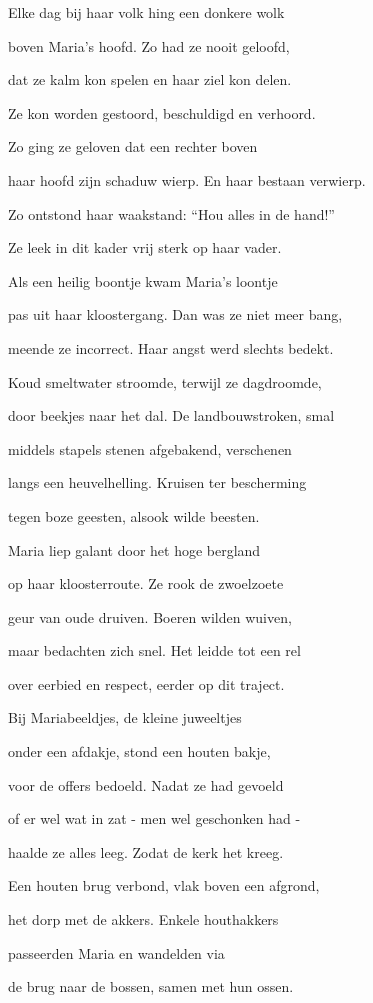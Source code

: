 Elke dag bij haar volk
hing een donkere wolk

boven Maria’s hoofd.
Zo had ze nooit geloofd,

dat ze kalm kon spelen
en haar ziel kon delen.

Ze kon worden gestoord,
beschuldigd en verhoord.

Zo ging ze geloven
dat een rechter boven

haar hoofd zijn schaduw wierp.
En haar bestaan verwierp.

Zo ontstond haar waakstand:
“Hou alles in de hand!”

Ze leek in dit kader
vrij sterk op haar vader.

Als een heilig boontje
kwam Maria’s loontje

pas uit haar kloostergang.
Dan was ze niet meer bang,

meende ze incorrect.
Haar angst werd slechts bedekt.

Koud smeltwater stroomde,
terwijl ze dagdroomde,

door beekjes naar het dal.
De landbouwstroken, smal

middels stapels stenen
afgebakend, verschenen

langs een heuvelhelling.
Kruisen ter bescherming

tegen boze geesten,
alsook wilde beesten.

Maria liep galant
door het hoge bergland

op haar kloosterroute.
Ze rook de zwoelzoete

geur van oude druiven.
Boeren wilden wuiven,

maar bedachten zich snel.
Het leidde tot een rel

over eerbied en respect,
eerder op dit traject.

Bij Mariabeeldjes,
de kleine juweeltjes

onder een afdakje,
stond een houten bakje,

voor de offers bedoeld.
Nadat ze had gevoeld

of er wel wat in zat -
men wel geschonken had -

haalde ze alles leeg.
Zodat de kerk het kreeg.

Een houten brug verbond,
vlak boven een afgrond,

het dorp met de akkers.
Enkele houthakkers

passeerden Maria
en wandelden via

de brug naar de bossen,
samen met hun ossen.

